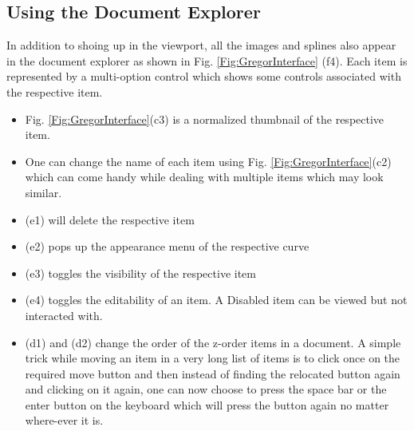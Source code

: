 \subsection{Using the Document Explorer}
{
    In addition to shoing up in the viewport, all the images and splines also appear in the document explorer as shown in Fig. \ref{Fig:GregorInterface} (f4). Each item is represented by a multi-option control which shows some controls associated with the respective item.
    \begin{itemize}
      \item Fig. \ref{Fig:GregorInterface}(c3) is a normalized thumbnail of the respective item.
      \item One can change the name of each item using Fig. \ref{Fig:GregorInterface}(c2) which can come handy while dealing with multiple items which may look similar.
      \item (e1) will delete the respective item
      \item (e2) pops up the appearance menu of the respective curve
      \item (e3) toggles the visibility of the respective item
      \item (e4) toggles the editability of an item. A Disabled item can be viewed but not interacted with.
      \item (d1) and (d2) change the order of the z-order items in a document. A simple trick while moving an item in a very long list of items is to click once on the required move button and then instead of finding the relocated button again and clicking on it again, one can now choose to press the space bar or the enter button on the keyboard which will press the button again no matter where-ever it is.
    \end{itemize}

}
